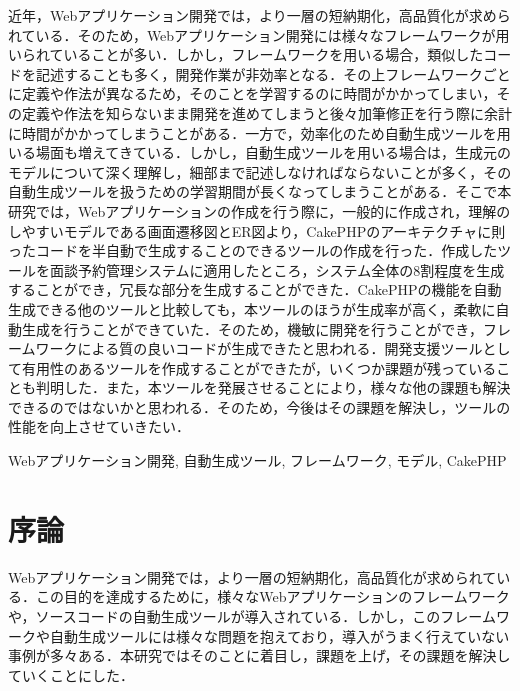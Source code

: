 \documentclass{funthesis}
\begin{document}
\begin{jabstract}
近年，Webアプリケーション開発では，より一層の短納期化，高品質化が求められている．そのため，Webアプリケーション開発には様々なフレームワークが用いられていることが多い．しかし，フレームワークを用いる場合，類似したコードを記述することも多く，開発作業が非効率となる．その上フレームワークごとに定義や作法が異なるため，そのことを学習するのに時間がかかってしまい，その定義や作法を知らないまま開発を進めてしまうと後々加筆修正を行う際に余計に時間がかかってしまうことがある．一方で，効率化のため自動生成ツールを用いる場面も増えてきている．しかし，自動生成ツールを用いる場合は，生成元のモデルについて深く理解し，細部まで記述しなければならないことが多く，その自動生成ツールを扱うための学習期間が長くなってしまうことがある．そこで本研究では，Webアプリケーションの作成を行う際に，一般的に作成され，理解のしやすいモデルである画面遷移図とER図より，CakePHPのアーキテクチャに則ったコードを半自動で生成することのできるツールの作成を行った．作成したツールを面談予約管理システムに適用したところ，システム全体の8割程度を生成することができ，冗長な部分を生成することができた．CakePHPの機能を自動生成できる他のツールと比較しても，本ツールのほうが生成率が高く，柔軟に自動生成を行うことができていた．そのため，機敏に開発を行うことができ，フレームワークによる質の良いコードが生成できたと思われる．開発支援ツールとして有用性のあるツールを作成することができたが，いくつか課題が残っていることも判明した．また，本ツールを発展させることにより，様々な他の課題も解決できるのではないかと思われる．そのため，今後はその課題を解決し，ツールの性能を向上させていきたい．

\end{jabstract}

\begin{jkeyword}
Webアプリケーション開発, 自動生成ツール, フレームワーク, モデル, CakePHP
\end{jkeyword}

\tableofcontents %


\chapter{序論} %
Webアプリケーション開発では，より一層の短納期化，高品質化が求められている．この目的を達成するために，様々なWebアプリケーションのフレームワークや，ソースコードの自動生成ツールが導入されている．しかし，このフレームワークや自動生成ツールには様々な問題を抱えており，導入がうまく行えていない事例が多々ある．本研究ではそのことに着目し，課題を上げ，その課題を解決していくことにした．
\end{document}
